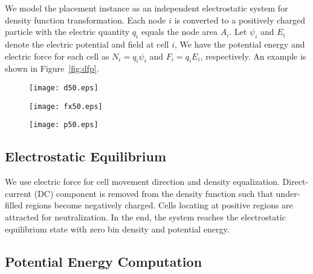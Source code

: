 \documentclass[conference,10pt]{IEEEtran}
\begin{document}
We model the placement instance as an 
independent electrostatic system for 
density function transformation. 
Each node $i$ is converted to a
positively charged particle with  
the electric quantity $q_i$ equals
the node area $A_i$. 
Let $\psi_i$ and $E_i$ denote the 
electric potential and field at cell $i$,  
We have the potential energy and electric force 
for each cell as $N_i=q_i\psi_i$ 
and $F_i=q_iE_i$, respectively.
An example is shown in Figure~\ref{fig:dfp}.
\begin{figure*}\centering
  \begin{subfigure}[b]{0.33\textwidth}
    \centering
    \texttt{[image: d50.eps]}
    \caption{}
    \label{subfig:den}
  \end{subfigure}
  \begin{subfigure}[b]{0.33\textwidth}
    \centering
    \texttt{[image: fx50.eps]}
    \caption{}
    \label{subfig:field}
  \end{subfigure}\begin{subfigure}[b]{0.33\textwidth}
    \centering
    \texttt{[image: p50.eps]}
    \caption{}
    \label{subfig:phi}
  \end{subfigure}
  \caption{The distribution of electric (a) density (b) field (c) potential without filler insertion. Snapshots are extracted at iteration 50 of ADAPTEC1.} 
\label{fig:dfp}
\end{figure*}


\subsection{Electrostatic Equilibrium}

We use electric force for cell movement direction
and density equalization. 
Direct-current (DC) component is removed
from the density function such that 
under-filled regions become negatively charged. 
Cells locating at positive regions are 
attracted for neutralization.
In the end, the system reaches the electrostatic 
equilibrium state with zero bin density and potential 
energy.








\subsection{Potential Energy Computation}
\end{document}
